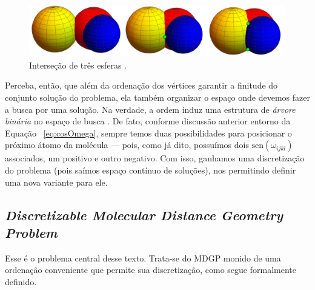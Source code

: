 \documentclass[a4paper,12pt]{article}
\begin{document}
 	\begin{figure}[H]
 		\begin{center}
 			\includegraphics[width=0.8\linewidth]{esferas.png}
 		\end{center}
 		\caption{Interseção de três esferas \cite{carlileBook31Coloquio}.}
 		\label{fig:esferas}
 	\end{figure}
 	
 	Perceba, então, que além da ordenação dos vértices garantir a finitude do conjunto solução do problema, ela também organizar o espaço onde devemos fazer a busca por uma solução. Na verdade, a ordem induz uma estrutura de \textit{árvore binária} no espaço de busca \cite{fidalgotese}. De fato, conforme discussão anterior entorno da Equação ~\ref{eq:cosOmega}, sempre temos duas possibilidades para posicionar o próximo átomo da molécula \cite{carlileGDandAplications} --- pois, como já dito, possuímos dois $\mbox{sen}(\omega_{ijkl})$ associados, um positivo e outro negativo. Com isso, ganhamos uma discretização do problema (pois saímos espaço contínuo de soluções), nos permitindo definir uma nova variante para ele.
 	
 	\subsection{\textit{Discretizable Molecular Distance Geometry Problem}}
 	Esse é o problema central desse texto. Trata-se do MDGP monido de uma ordenação conveniente que permite sua discretização, como segue formalmente definido.
 	
\end{document}
